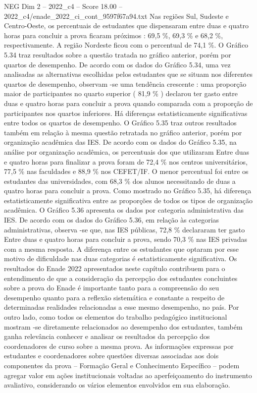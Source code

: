 \begin{textsample}{NEG Dim 2 – 2022\_c4 – Score 18.00 – 2022\_c4/enade\_2022\_ci\_cont\_9597f67a94.txt}
Nas regiões Sul, Sudeste e Centro-Oeste, os percentuais de estudantes que dispensaram entre duas e quatro horas para concluir a prova ficaram próximos : 69,5 \%, 69,3 \% e 68,2 \%, respectivamente.
A região Nordeste ficou com o percentual de 74,1 \%.
O Gráfico 5.34 traz resultados sobre a questão tratada no gráfico anterior, porém por quartos de desempenho.
De acordo com os dados do Gráfico 5.34, uma vez analisadas as alternativas escolhidas pelos estudantes que se situam nos diferentes quartos de desempenho, observam -se uma tendência crescente : uma proporção maior de participantes no quarto superior ( 81,9 \% ) declarou ter gasto entre duas e quatro horas para concluir a prova quando comparada com a proporção de participantes nos quartos inferiores.
Há diferenças estatisticamente significativas entre todos os quartos de desempenho.
O Gráfico 5.35 traz outros resultados também em relação à mesma questão retratada no gráfico anterior, porém por organização acadêmica das IES.
De acordo com os dados do Gráfico 5.35, na análise por organização acadêmica, os percentuais dos que utilizaram Entre duas e quatro horas para finalizar a prova foram de 72,4 \% nos centros universitários, 77,5 \% nas faculdades e 88,9 \% nos CEFET/IF.
O menor percentual foi entre os estudantes das universidades, com 68,3 \% dos alunos necessitando de duas a quatro horas para concluir a prova.
Como mostrado no Gráfico 5.35, há diferença estatisticamente significativa entre as proporções de todos os tipos de organização acadêmica.
O Gráfico 5.36 apresenta os dados por categoria administrativa das IES.
De acordo com os dados do Gráfico 5.36, em relação às categorias administrativas, observa -se que, nas IES públicas, 72,8 \% declararam ter gasto Entre duas e quatro horas para concluir a prova, sendo 70,3 \% nas IES privadas com a mesma resposta.
A diferença entre os estudantes que optaram por esse motivo de dificuldade nas duas categorias é estatisticamente significativa.
Os resultados do Enade 2022 apresentados neste capítulo contribuem para o entendimento de que a consideração da percepção dos estudantes concluintes sobre a prova do Enade é importante tanto para a compreensão do seu desempenho quanto para a reflexão sistemática e constante a respeito de determinadas realidades relacionadas a esse mesmo desempenho, no país.
Por outro lado, como todos os elementos do trabalho pedagógico institucional mostram -se diretamente relacionados ao desempenho dos estudantes, também ganha relevância conhecer e analisar os resultados da percepção dos coordenadores de curso sobre a mesma prova.
As informações expressas por estudantes e coordenadores sobre questões diversas associadas aos dois componentes da prova – Formação Geral e Conhecimento Específico – podem agregar valor em ações institucionais voltadas ao aperfeiçoamento do instrumento avaliativo, considerando os vários elementos envolvidos em sua elaboração.

\end{textsample}
